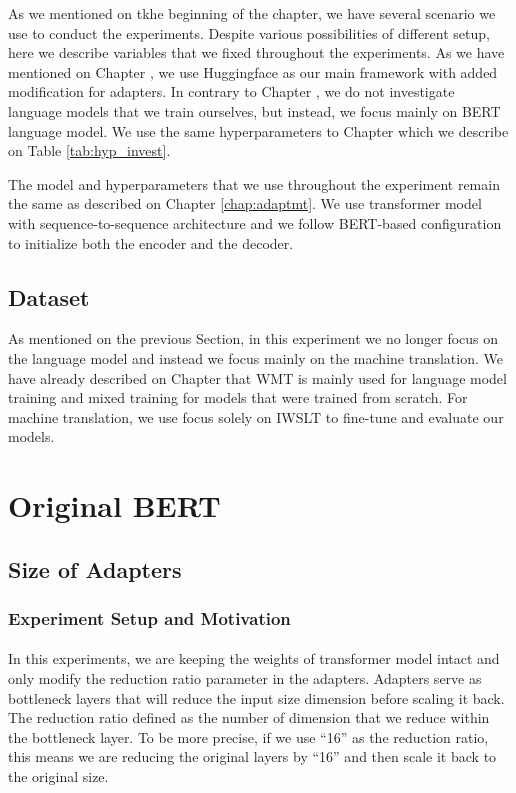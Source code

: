 As we mentioned on tkhe beginning of the chapter, we have several scenario we use to conduct the experiments. Despite various possibilities of different setup, here we describe variables that we fixed throughout the experiments. As we have mentioned on Chapter \label{chap:03}, we use Huggingface as our main framework with added modification for adapters. In contrary to Chapter \label{chap:adaptmt}, we do not investigate language models that we train ourselves, but instead, we focus mainly on BERT language model. We use the same hyperparameters to Chapter \label{chap:03} which we describe on Table \ref{tab:hyp_invest}.

The model and hyperparameters that we use throughout the experiment remain the same as described on Chapter \ref{chap:adaptmt}. We use transformer model with sequence-to-sequence architecture and we follow BERT-based configuration to initialize both the encoder and the decoder.


\subsection{Dataset}
As mentioned on the previous Section, in this experiment we no longer focus on the language model and instead we focus mainly on the machine translation. We have already described on Chapter \label{chap:03} that WMT is mainly used for language model training and mixed training for models that were trained from scratch. For machine translation, we use focus solely on IWSLT to fine-tune and evaluate our models.


\section{Original BERT}
\subsection{Size of Adapters}
\subsubsection{Experiment Setup and Motivation}
\paragraph{}
In this experiments, we are keeping the weights of transformer model intact and only modify the reduction ratio parameter in the adapters. Adapters serve as bottleneck layers that will reduce the input size dimension before scaling it back. The reduction ratio defined as the number of dimension that we reduce within the bottleneck layer. To be more precise, if we use ``16'' as the reduction ratio, this means we are reducing the original layers by ``16'' and then scale it back to the original size.

